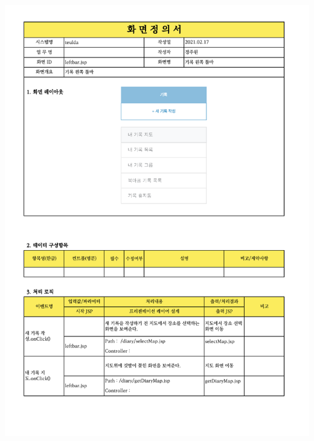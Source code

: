 {{{{{{{{{{{{{{{{{{{{{{{{{{{{{{{{{{{{{{{{{{{\includegraphics[width=20cm]{./Figure/Design/Display/diary/diary_25.pdf} \\
}}}}}}}}}}}}}}}}}}}}}}}}}}}}}}}}}}}}}}}}}}}
